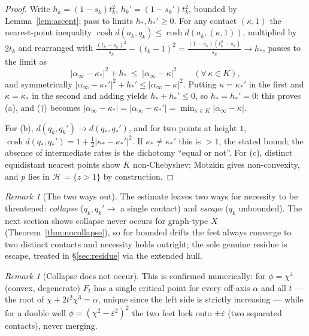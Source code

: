 \documentclass[11pt]{article}
\theoremstyle{remark}
\newtheorem{remark}[theorem]{Remark}
\newcommand{\X}{X}
\newcommand{\Hb}[1]{\mathcal{H}_{#1}}
\begin{document}
\begin{proof}
Write $h_{k}=(1-s_{k})t_{k}^{2}$, $h_{k}'=(1-s_{k}')t_{k}^{2}$, bounded
by Lemma~\ref{lem:ascent}; pass to limits $h_{\ast},h_{\ast}'\ge0$.
For any contact $(\kappa,1)$ the nearest-point inequality
$\cosh d(a_{k},q_{k})\le\cosh d(a_{k},(\kappa,1))$, multiplied by
$2t_{k}$ and rearranged with
$\frac{(t_{k}-s_{k})^{2}}{s_{k}}-(t_{k}-1)^{2}=
\frac{(1-s_{k})(t_{k}^{2}-s_{k})}{s_{k}}\to h_{\ast}$, passes to the
limit as
\[
\lvert\alpha_{\infty}-\kappa_{\ast}\rvert^{2}+h_{\ast}\ \le\
\lvert\alpha_{\infty}-\kappa\rvert^{2}\qquad(\forall\,\kappa\in K),
\tag{$\dagger$}
\]
and symmetrically
$\lvert\alpha_{\infty}-\kappa_{\ast}'\rvert^{2}+h_{\ast}'\le
\lvert\alpha_{\infty}-\kappa\rvert^{2}$. Putting $\kappa=
\kappa_{\ast}'$ in the first and $\kappa=\kappa_{\ast}$ in the second
and adding yields $h_{\ast}+h_{\ast}'\le0$, so $h_{\ast}=h_{\ast}'=0$:
this proves (a), and ($\dagger$) becomes
$\lvert\alpha_{\infty}-\kappa_{\ast}\rvert=
\lvert\alpha_{\infty}-\kappa_{\ast}'\rvert=
\min_{\kappa\in K}\lvert\alpha_{\infty}-\kappa\rvert$.

For (b), $d(q_{k},q_{k}')\to d(q_{\ast},q_{\ast}')$, and for two points
at height $1$,
$\cosh d(q_{\ast},q_{\ast}')=1+\tfrac12\lvert\kappa_{\ast}-
\kappa_{\ast}'\rvert^{2}$. If $\kappa_{\ast}\neq\kappa_{\ast}'$ this is
$>1$, the stated bound; the absence of intermediate rates is the
dichotomy ``equal or not''. For (c), distinct equidistant nearest
points show $K$ non-Chebyshev; Motzkin gives non-convexity, and
$p$ lies in $\Hb{}=\{z>1\}$ by construction.
\end{proof}

\begin{remark}[The two ways out]\label{rem:collapse-residue}
The estimate leaves two ways for necessity to be threatened:
\emph{collapse} ($q_{k},q_{k}'\to$ a single contact) and \emph{escape}
($q_{k}$ unbounded). The next section shows collapse never occurs for
graph-type $\X$ (Theorem~\ref{thm:nocollapse}), so for bounded drifts
the feet always converge to two distinct contacts and necessity holds
outright; the sole genuine residue is escape, treated in
\S\ref{sec:residue} via the extended hull.
\end{remark}

\begin{remark}[Collapse does not occur]\label{rem:nocollapse-num}
This is confirmed numerically: for $\phi=\chi^{4}$ (convex, degenerate)
$F_{t}$ has a single critical point for every off-axis $\alpha$ and
all $t$ --- the root of $\chi+2t^{2}\chi^{3}=\alpha$, unique since the
left side is strictly increasing --- while for a double well
$\phi=(\chi^{2}-\varepsilon^{2})^{2}$ the two feet lock onto
$\pm\varepsilon$ (two separated contacts), never merging.
\end{remark}
\end{document}
